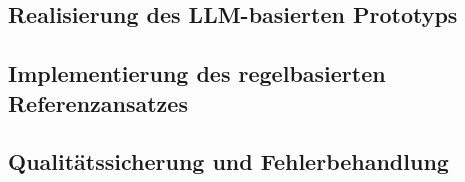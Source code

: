 \subsection{Realisierung des LLM-basierten Prototyps}

\subsection{Implementierung des regelbasierten Referenzansatzes}

\subsection{Qualitätssicherung und Fehlerbehandlung}
